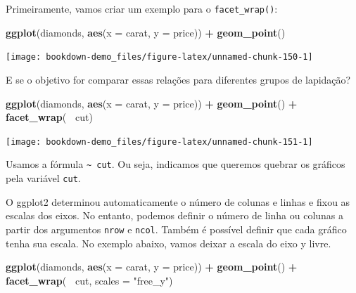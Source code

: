 \documentclass[]{book}
\newenvironment{Shaded}{\begin{snugshade}}{\end{snugshade}}
\newcommand{\KeywordTok}[1]{\textcolor[rgb]{0.13,0.29,0.53}{\textbf{#1}}}
\newcommand{\DataTypeTok}[1]{\textcolor[rgb]{0.13,0.29,0.53}{#1}}
\newcommand{\StringTok}[1]{\textcolor[rgb]{0.31,0.60,0.02}{#1}}
\newcommand{\OperatorTok}[1]{\textcolor[rgb]{0.81,0.36,0.00}{\textbf{#1}}}
\newcommand{\NormalTok}[1]{#1}
\begin{document}
Primeiramente, vamos criar um exemplo para o \texttt{facet\_wrap()}:

\begin{Shaded}
\begin{Highlighting}[]
\KeywordTok{ggplot}\NormalTok{(diamonds, }\KeywordTok{aes}\NormalTok{(}\DataTypeTok{x =}\NormalTok{ carat, }\DataTypeTok{y =}\NormalTok{ price)) }\OperatorTok{+}
\StringTok{  }\KeywordTok{geom_point}\NormalTok{()}
\end{Highlighting}
\end{Shaded}

\begin{center}\texttt{[image: bookdown-demo\_files/figure-latex/unnamed-chunk-150-1]} \end{center}

E se o objetivo for comparar essas relações para diferentes grupos de
lapidação?

\begin{Shaded}
\begin{Highlighting}[]
\KeywordTok{ggplot}\NormalTok{(diamonds, }\KeywordTok{aes}\NormalTok{(}\DataTypeTok{x =}\NormalTok{ carat, }\DataTypeTok{y =}\NormalTok{ price)) }\OperatorTok{+}
\StringTok{  }\KeywordTok{geom_point}\NormalTok{() }\OperatorTok{+}
\StringTok{  }\KeywordTok{facet_wrap}\NormalTok{(}\OperatorTok{~}\StringTok{ }\NormalTok{cut)}
\end{Highlighting}
\end{Shaded}

\begin{center}\texttt{[image: bookdown-demo\_files/figure-latex/unnamed-chunk-151-1]} \end{center}

Usamos a fórmula \texttt{\textasciitilde{}\ cut}. Ou seja, indicamos que
queremos quebrar os gráficos pela variável \texttt{cut}.

O ggplot2 determinou automaticamente o número de colunas e linhas e
fixou as escalas dos eixos. No entanto, podemos definir o número de
linha ou colunas a partir dos argumentos \texttt{nrow} e \texttt{ncol}.
Também é possível definir que cada gráfico tenha sua escala. No exemplo
abaixo, vamos deixar a escala do eixo y livre.

\begin{Shaded}
\begin{Highlighting}[]
\KeywordTok{ggplot}\NormalTok{(diamonds, }\KeywordTok{aes}\NormalTok{(}\DataTypeTok{x =}\NormalTok{ carat, }\DataTypeTok{y =}\NormalTok{ price)) }\OperatorTok{+}
\StringTok{  }\KeywordTok{geom_point}\NormalTok{() }\OperatorTok{+}
\StringTok{  }\KeywordTok{facet_wrap}\NormalTok{(}\OperatorTok{~}\StringTok{ }\NormalTok{cut, }\DataTypeTok{scales =} \StringTok{"free_y"}\NormalTok{)}
\end{Highlighting}
\end{Shaded}
\end{document}
